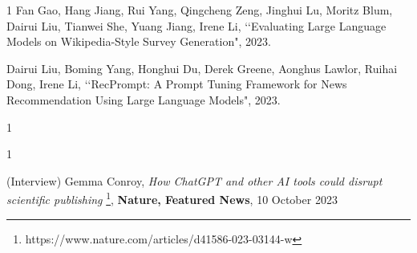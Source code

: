 \begin{発表}{1}
Fan Gao, Hang Jiang, Rui Yang, Qingcheng Zeng, Jinghui Lu, Moritz Blum, Dairui Liu, Tianwei She, Yuang Jiang, Irene Li, \lq\lq Evaluating Large Language Models on Wikipedia-Style Survey Generation", 2023.

Dairui Liu, Boming Yang, Honghui Du, Derek Greene, Aonghus Lawlor, Ruihai Dong, Irene Li, \lq\lq RecPrompt: A Prompt Tuning Framework for News Recommendation Using Large Language Models", 2023.


\end{発表}

\begin{特記}{1}

\end{特記}

\begin{報道}{1}


(Interview) Gemma Conroy, \textit{How ChatGPT and other AI tools could disrupt scientific publishing} \footnote{https://www.nature.com/articles/d41586-023-03144-w}, \textbf{Nature, Featured News}, 10 October 2023 

\end{報道}
